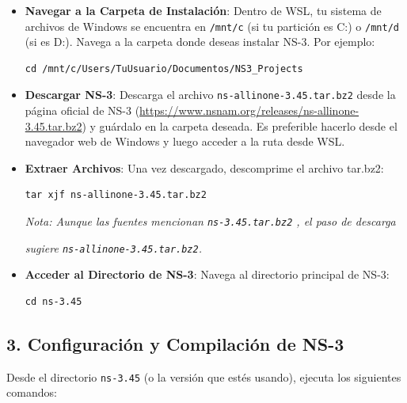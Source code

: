 \documentclass{article}
\begin{document}
\begin{itemize}
    \item \textbf{Navegar a la Carpeta de Instalación}: Dentro de WSL, tu sistema de archivos de Windows se encuentra en \texttt{/mnt/c} (si tu partición es C:) o \texttt{/mnt/d} (si es D:). Navega a la carpeta donde deseas instalar NS-3. Por ejemplo:
    \begin{lstlisting}
cd /mnt/c/Users/TuUsuario/Documentos/NS3_Projects
    \end{lstlisting}
    \item \textbf{Descargar NS-3}: Descarga el archivo \texttt{ns-allinone-3.45.tar.bz2} desde la página oficial de NS-3 (\url{https://www.nsnam.org/releases/ns-allinone-3.45.tar.bz2}) y guárdalo en la carpeta deseada. Es preferible hacerlo desde el navegador web de Windows y luego acceder a la ruta desde WSL.
    \item \textbf{Extraer Archivos}: Una vez descargado, descomprime el archivo tar.bz2:
    \begin{lstlisting}
tar xjf ns-allinone-3.45.tar.bz2
    \end{lstlisting}
    \textit{Nota: Aunque las fuentes mencionan \texttt{ns-3.45.tar.bz2} , el paso de descarga}

        \textit{sugiere \texttt{ns-allinone-3.45.tar.bz2}.}
    \item \textbf{Acceder al Directorio de NS-3}: Navega al directorio principal de NS-3:
    \begin{lstlisting}
cd ns-3.45
    \end{lstlisting}
\end{itemize}

\subsection*{\textbf{3. Configuración y Compilación de NS-3}}

Desde el directorio \texttt{ns-3.45} (o la versión que estés usando), ejecuta los siguientes comandos:
\end{document}
